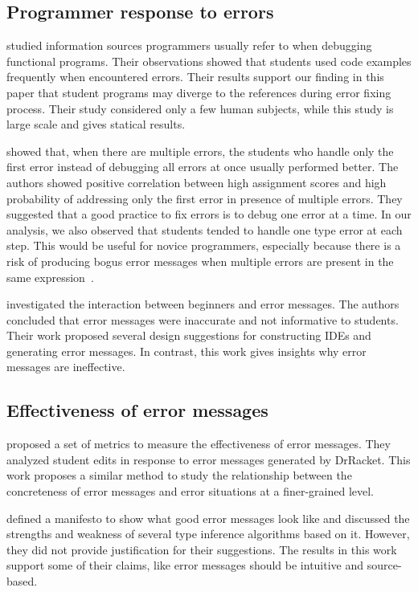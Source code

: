 \documentclass[12pt]{report}	%
\begin{document}
\subsection{Programmer response to errors}

\cite{chambers2012function} studied information sources programmers
usually refer to when debugging functional
programs.
Their observations showed that students used
code examples frequently
when encountered errors.
Their results support our finding in this paper that
student programs may diverge to the references
during error fixing process. Their study
considered only a few human subjects, while this study is
large scale and gives statical results.

\cite{munson2016analyzing}
showed that, when there are multiple errors,
the students who handle only the first error
instead of debugging all errors at once usually
performed better.
The authors showed positive correlation
between high assignment scores and
high probability of addressing only
the first error in presence of multiple errors.
%
They suggested that a good practice to fix
errors is to debug one error at a time.
In our analysis, we also observed that
students tended to handle one type error at each step.
This would be useful for novice programmers, especially
because there is a risk of producing bogus error messages
when multiple errors are present in
the same expression~\cite{Heeren05:TQT}.

\cite{marceau2011mind} investigated the interaction between
beginners and error messages.
The authors concluded that error messages were
inaccurate and not informative to students.
Their work proposed several design
suggestions for constructing IDEs and generating
error messages.
In contrast, this work gives insights
why error messages are ineffective.

\subsection{Effectiveness of error messages}

\cite{marceau2011measuring} proposed a set of metrics to
measure the effectiveness of
error messages.
They analyzed student edits
in response to error messages generated by DrRacket.
This work proposes a similar method to study
the relationship between
the concreteness of error messages and
error situations at a finer-grained level.

\cite{yang2000improved} defined a manifesto to show
what good error messages look like and discussed
the strengths and weakness of several type inference
algorithms based on it.
However, they did not provide justification
for their suggestions.
The results in this work support some of their claims,
like error messages
should be intuitive and source-based.
\end{document}
